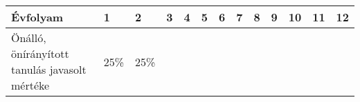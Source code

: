 \begin{longtable}[]{@{}lllllllllllll@{}}
\toprule
\begin{minipage}[b]{0.33\columnwidth}\raggedright
Évfolyam\strut
\end{minipage} & \begin{minipage}[b]{0.03\columnwidth}\raggedright
1\strut
\end{minipage} & \begin{minipage}[b]{0.03\columnwidth}\raggedright
2\strut
\end{minipage} & \begin{minipage}[b]{0.03\columnwidth}\raggedright
3\strut
\end{minipage} & \begin{minipage}[b]{0.03\columnwidth}\raggedright
4\strut
\end{minipage} & \begin{minipage}[b]{0.03\columnwidth}\raggedright
5\strut
\end{minipage} & \begin{minipage}[b]{0.03\columnwidth}\raggedright
6\strut
\end{minipage} & \begin{minipage}[b]{0.03\columnwidth}\raggedright
7\strut
\end{minipage} & \begin{minipage}[b]{0.03\columnwidth}\raggedright
8\strut
\end{minipage} & \begin{minipage}[b]{0.03\columnwidth}\raggedright
9\strut
\end{minipage} & \begin{minipage}[b]{0.03\columnwidth}\raggedright
10\strut
\end{minipage} & \begin{minipage}[b]{0.03\columnwidth}\raggedright
11\strut
\end{minipage} & \begin{minipage}[b]{0.03\columnwidth}\raggedright
12\strut
\end{minipage}\tabularnewline
\midrule
\endhead
\begin{minipage}[t]{0.33\columnwidth}\raggedright
Önálló, önírányított tanulás javasolt mértéke\strut
\end{minipage} & \begin{minipage}[t]{0.03\columnwidth}\raggedright
25\%\strut
\end{minipage} & \begin{minipage}[t]{0.03\columnwidth}\raggedright
25\%\strut

\end{minipage}
\end{longtable}
